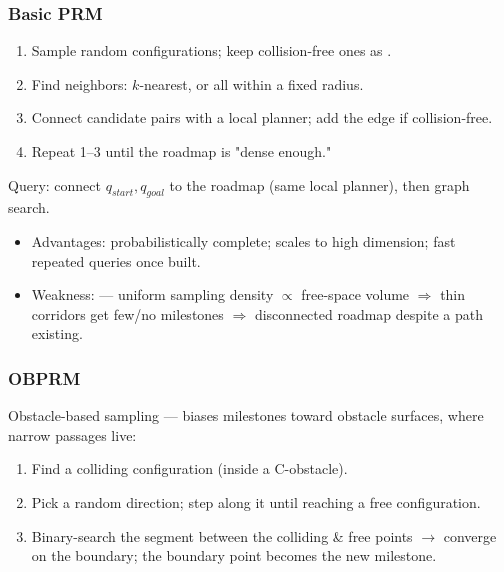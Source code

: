 \subsubsection{Basic PRM}
\begin{enumerate}
\item Sample random configurations; keep collision-free ones as .
\item Find neighbors: $k$-nearest, or all within a fixed radius.
\item Connect candidate pairs with a local planner; add the edge if collision-free.
\item Repeat 1--3 until the roadmap is "dense enough."
\end{enumerate}
Query: connect $q_{start},q_{goal}$ to the roadmap (same local planner), then graph search.
\begin{itemize}
\item Advantages: probabilistically complete; scales to high dimension; fast repeated queries once built.
\item Weakness:  — uniform sampling density $\propto$ free-space volume $\Rightarrow$ thin corridors get few/no milestones $\Rightarrow$ disconnected roadmap despite a path existing.
\end{itemize}


\begin{democallout}
\end{democallout}

\subsubsection{OBPRM}
Obstacle-based sampling — biases milestones toward obstacle surfaces, where narrow passages live:
\begin{enumerate}
\item Find a colliding configuration (inside a C-obstacle).
\item Pick a random direction; step along it until reaching a free configuration.
\item Binary-search the segment between the colliding \& free points $\to$ converge on the boundary; the boundary point becomes the new milestone.
\end{enumerate}

